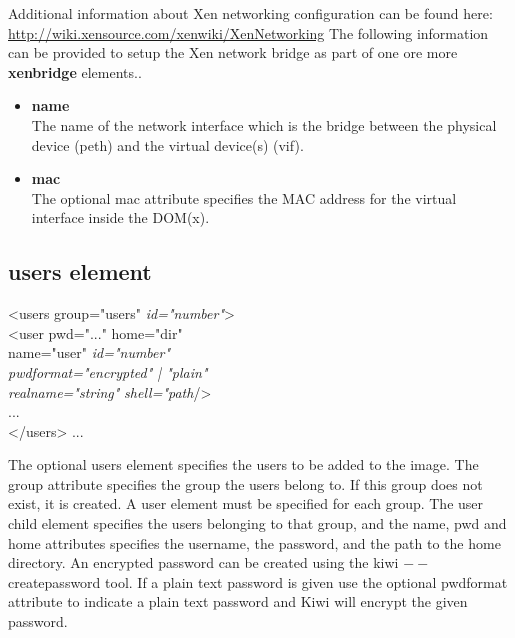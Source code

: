 \begin{itemize}
	Additional information about Xen networking configuration can be
	found here: \url{http://wiki.xensource.com/xenwiki/XenNetworking}
	The following information can be provided to setup the Xen network
	bridge as part of one ore more \textbf{xenbridge} elements..

	\begin{itemize}
	\item \textbf{name}\\
      The name of the network interface which is the bridge between
      the physical device (peth) and the virtual device(s) (vif).
	\item \textbf{mac}\\
      The optional mac attribute specifies the MAC address for the virtual
      interface inside the DOM(x).
	\end{itemize}
\end{itemize}

\subsection{users element}
\begin{Command}{12cm}
<users group="users" \textit{id="number"}>\\
\hspace*{1cm}<user pwd="..." home="dir"\\ 
\hspace*{1.5cm}name="user" \textit{id="number"}\\
\hspace*{1.5cm}\textit{pwdformat="encrypted" | "plain"}\\
\hspace*{1.5cm}\textit{realname="string"} \textit{shell="path}/>\\
\hspace*{1cm}...\\
</users>
...
\end{Command}

The optional users element specifies the users to be added to the image.
The group attribute specifies the group the users belong to. If this group
does not exist, it is created. A user element must be specified for
each group. The user child element specifies the users belonging to that
group, and the name, pwd and home attributes specifies the username,
the password, and the path to the home directory. An encrypted password can be
created using the kiwi $--$createpassword tool. If a plain text password is
given use the optional pwdformat attribute to indicate a plain text password
and Kiwi will encrypt the given password.

